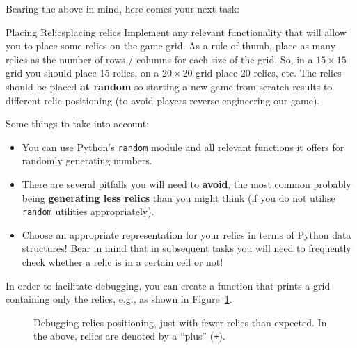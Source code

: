 \documentclass[a4paper, 11pt]{article}
\numberwithin{equation}{section}
\theoremstyle{definition}
\newcommand{\relic}{\texttt{+}}
\newcommand{\visited}{\texttt{.}}
\begin{document}
	Bearing the above in mind, here comes your next task:
	
	\begin{task}{Placing Relics}{placing relics}
		Implement any relevant functionality that will allow you to place some relics on the game grid. As a rule of thumb, place as many relics as the number of rows / columns for each size of the grid. So, in a $15\times 15$ grid you should place 15 relics, on a $20\times 20$ grid place 20 relics, etc. The relics should be placed \textbf{at random} so starting a new game from scratch results to different relic positioning (to avoid players reverse engineering our game).
		
		Some things to take into account:
		\begin{itemize}
			\item You can use Python's \texttt{random} module and all relevant functions it offers for randomly generating numbers.
			\item There are several pitfalls you will need to \textbf{avoid}, the most common probably being \textbf{generating less relics} than you might think (if you do not utilise \texttt{random} utilities appropriately).
			\item Choose an appropriate representation for your relics in terms of Python data structures! Bear in mind that in subsequent tasks you will need to frequently check whether a relic is in a certain cell or not!
		\end{itemize}
		
		In order to facilitate debugging, you can create a function that prints a grid containing only the relics, e.g., as shown in Figure~\ref{fig:relics}.
	\end{task}
	
	\begin{figure}[!tb]
		\centering
		\caption{Debugging relics positioning, just with fewer relics than expected. In the above, relics are denoted by a ``plus'' (\relic).}
		\label{fig:relics}
	\end{figure}
	
\end{document}
